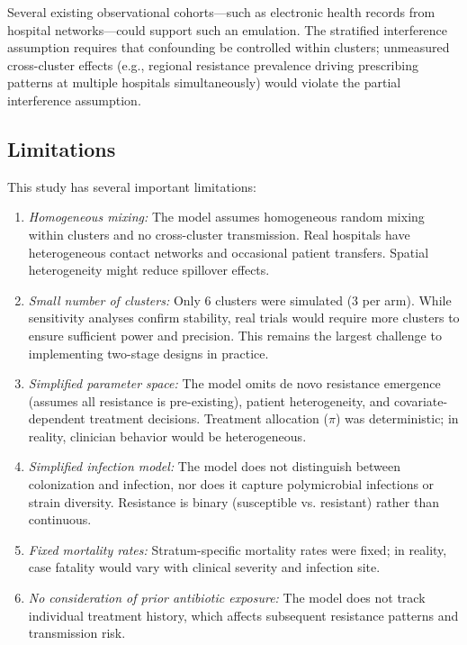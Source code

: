 Several existing observational cohorts---such as electronic health records from hospital networks---could
support such an emulation. The stratified interference assumption requires that confounding be controlled
within clusters; unmeasured cross-cluster effects (e.g., regional resistance prevalence driving prescribing
patterns at multiple hospitals simultaneously) would violate the partial interference assumption.

\subsection{Limitations}

This study has several important limitations:

\begin{enumerate}
  \item \textit{Homogeneous mixing:} The model assumes homogeneous random mixing within clusters and
  no cross-cluster transmission. Real hospitals have heterogeneous contact networks and occasional
  patient transfers. Spatial heterogeneity might reduce spillover effects.

  \item \textit{Small number of clusters:} Only 6 clusters were simulated (3 per arm). While
  sensitivity analyses confirm stability, real trials would require more clusters to ensure sufficient
  power and precision. This remains the largest challenge to implementing two-stage designs in practice.

  \item \textit{Simplified parameter space:} The model omits de novo resistance emergence (assumes all
  resistance is pre-existing), patient heterogeneity, and covariate-dependent treatment decisions.
  Treatment allocation ($\pi$) was deterministic; in reality, clinician behavior would be heterogeneous.

  \item \textit{Simplified infection model:} The model does not distinguish between colonization and
  infection, nor does it capture polymicrobial infections or strain diversity. Resistance is binary
  (susceptible vs. resistant) rather than continuous.

  \item \textit{Fixed mortality rates:} Stratum-specific mortality rates were fixed; in reality, case
  fatality would vary with clinical severity and infection site.

  \item \textit{No consideration of prior antibiotic exposure:} The model does not track individual
  treatment history, which affects subsequent resistance patterns and transmission risk.
\end{enumerate}

